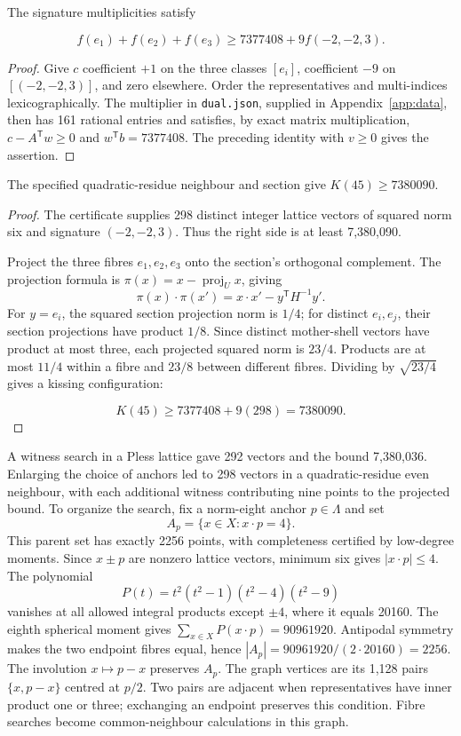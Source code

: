 \begin{proposition}
\label{prop:moment45}
The signature multiplicities satisfy

\[
f(e_1)+f(e_2)+f(e_3)
\ge7377408+9f(-2,-2,3).
\]
\end{proposition}
\begin{proof}
Give $c$ coefficient $+1$ on the three classes $[e_i]$, coefficient
$-9$ on $[(-2,-2,3)]$, and zero elsewhere. Order the representatives
and multi-indices lexicographically. The multiplier in
\texttt{dual.json}, supplied in Appendix~\ref{app:data}, then has 161
rational entries and satisfies, by exact matrix multiplication,
$c-A^{\mathsf T}w\ge0$ and $w^{\mathsf T}b=7377408$.
The preceding identity with $v\ge0$ gives the assertion.
\end{proof}

\begin{corollary}
\label{cor:section45}
The specified quadratic-residue neighbour and section give
$K(45)\ge7380090$.
\end{corollary}
\begin{proof}
The certificate supplies 298 distinct integer lattice vectors of squared
norm six and signature \((-2,-2,3)\). Thus the right side is at least
7,380,090.

Project the three fibres \(e_1,e_2,e_3\) onto the section's orthogonal
complement. The projection formula is
$\pi(x)=x-\operatorname{proj}_{U}x$, giving
\[
\pi(x)\cdot\pi(x')=x\cdot x'-y^{\mathsf T}H^{-1}y'.
\]
For $y=e_i$, the squared section projection norm is $1/4$; for distinct
$e_i,e_j$, their section projections have product $1/8$. Since distinct
mother-shell vectors have product at most three, each projected squared
norm is \(23/4\). Products are at
most \(11/4\) within a fibre and \(23/8\) between different fibres.
Dividing by \(\sqrt{23/4}\) gives a kissing configuration:

\[
K(45)\ge7377408+9(298)=7380090.
\]
\end{proof}

A witness search in a Pless lattice gave 292 vectors and the bound
7,380,036. Enlarging the choice of anchors led to 298 vectors in a
quadratic-residue even neighbour, with each additional witness contributing
nine points to the projected bound. To organize the search, fix a
norm-eight anchor $p\in\Lambda$ and set
\[
A_p=\{x\in X:x\cdot p=4\}.
\]
This parent set has exactly 2256 points, with completeness certified by
low-degree moments. Since $x\pm p$ are nonzero lattice vectors,
minimum six gives $|x\cdot p|\le4$. The polynomial
\[
P(t)=t^2(t^2-1)(t^2-4)(t^2-9)
\]
vanishes at all allowed integral products except $\pm4$, where it
equals 20160. The eighth spherical moment gives
$\sum_{x\in X}P(x\cdot p)=90961920$. Antipodal symmetry makes the
two endpoint fibres equal, hence
$|A_p|=90961920/(2\cdot20160)=2256$.
The involution $x\mapsto p-x$ preserves $A_p$. The graph vertices are
its 1,128 pairs \(\{x,p-x\}\) centred at \(p/2\). Two pairs are adjacent
when representatives have inner product one or three; exchanging an
endpoint preserves this condition. Fibre searches become
common-neighbour calculations in this graph.

